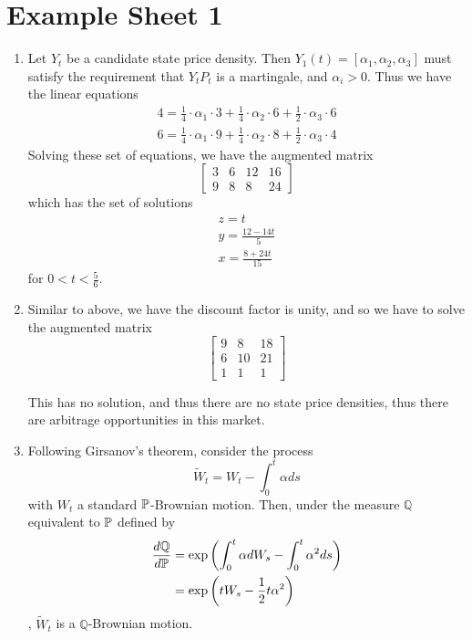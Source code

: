 \chapter{Example Sheet 1}
\label{cha:example-sheet-1}

\begin{enumerate}
\item \label{item:1} Let $Y_{t}$ be a candidate state price density. Then $Y_{1}(t) =
  [\alpha_{1}, \alpha_{2}, \alpha_{3}]$ must satisfy the requirement
  that $Y_{t} P_{t}$ is a martingale, and $\alpha_{i} > 0$. Thus we
  have the linear equations
  \begin{align}
    \label{eq:2}
    4 = \frac{1}{4} \cdot \alpha_{1} \cdot 3 + \frac{1}{4} \cdot
    \alpha_{2} \cdot 6 + \frac{1}{2} \cdot \alpha_{3} \cdot 6 \\
    6 = \frac{1}{4} \cdot \alpha_{1} \cdot 9 + \frac{1}{4} \cdot
    \alpha_{2} \cdot 8 + \frac{1}{2} \cdot \alpha_{3} \cdot 4
  \end{align}
  Solving these set of equations, we have the augmented matrix
  \begin{equation}
    \label{eq:4}
    \begin{bmatrix}
      3 & 6 & 12 & 16 \\
      9 & 8 & 8  & 24 
    \end{bmatrix}
  \end{equation}
  which has the set of solutions
  \begin{align}
    \label{eq:5}
    z = t \\
    y = \frac{12 - 14t}{5} \\
    x = \frac{8 + 24t}{15}
  \end{align} for $0 < t < \frac{5}{6}$.
\item \label{item:2} Similar to above, we have the discount factor is unity, and so
  we have to solve the augmented matrix
  \begin{equation}
    \label{eq:6}
    \begin{bmatrix}
      9 & 8 & 18 \\
      6 & 10 & 21 \\
      1 & 1 & 1 
    \end{bmatrix}
  \end{equation}

  This has no solution, and thus there are no state price densities,
  thus there are arbitrage opportunities in this market.
\item \label{item:3} Following Girsanov's theorem, consider the process
  \begin{equation}
    \label{eq:7}
    \tilde W_{t} = W_{t} - \int_{0}^{t} \alpha ds
  \end{equation}
  with $W_{t}$ a standard $\Prob$-Brownian motion. Then, under the measure
  $\mathbb{Q}$ equivalent to $\Prob $ defined by
  \begin{align}
    \label{eq:9}
    \frac{d \mathbb{Q}}{d \Prob} &= \exp \left( \int_{0}^{t} \alpha dW_{s} - \int_{0}^{t} \alpha^{2} ds \right) \\
    &= \exp \left( t W_{s} - \frac{1}{2} t \alpha^{2} \right)
  \end{align}, $\tilde W_{t}$ is a $\mathbb{Q}$-Brownian motion.


\end{enumerate}
